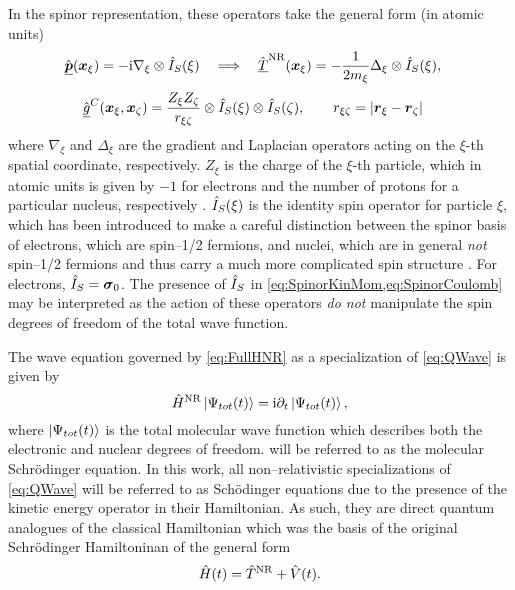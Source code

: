 In the spinor representation, these operators take the general form (in atomic units)
\begin{align}
  \label{eq:SpinorKinMom}
  &\hat{\underline{\boldsymbol{p}}}(\boldsymbol{x}_\xi) = -\mathrm i \nabla_\xi \otimes \hat{I}_S(\xi) \quad \Longrightarrow \quad 
  \hat{\underline{T}}^{\mathrm{NR}}(\boldsymbol{x}_\xi) = - \frac{1}{2m_\xi} \Delta_\xi \otimes \hat{I}_S(\xi),
\end{align}
\begin{align}
  \label{eq:SpinorCoulomb}
  &\hat{\underline{g}}^C(\boldsymbol{x}_\xi,\boldsymbol{x}_\zeta) = 
    \frac{Z_\xi Z_\zeta}{r_{\xi\zeta}} \otimes \hat{I}_S(\xi) \otimes \hat{I}_S(\zeta), \qquad r_{\xi\zeta} = \vert \boldsymbol{r}_\xi - \boldsymbol{r}_\zeta \vert
\end{align}
where $\nabla_\xi$ and $\Delta_\xi$ are the gradient and Laplacian operators acting on the $\xi$-th spatial coordinate,
respectively. $Z_\xi$ is the charge of the $\xi$-th particle, which in atomic units is given by $-1$ for electrons and 
the number of protons for a particular nucleus, respectively . 
$\hat{I}_S(\xi)$  is the identity spin operator for particle $\xi$, which has been introduced to make a
careful distinction between the spinor basis of electrons, which are spin--1/2 fermions, and nuclei, which are in general
\emph{not} spin--1/2 fermions and thus carry a much more complicated spin structure . For electrons, $\hat{I}_S=\boldsymbol{\sigma}_{0}$.
The presence of $\hat{I}_S$ in \cref{eq:SpinorKinMom,eq:SpinorCoulomb} may be interpreted as the action of these operators 
\emph{do not} manipulate the spin degrees of freedom of the total wave function.


The wave equation governed by \cref{eq:FullHNR} as a specialization of \cref{eq:QWave} is given by
\begin{equation}
\label{eq:FullNRSCH}
\hat{H}^{\mathrm{NR}} \left\vert \Psi_{tot} (t) \right\rangle = \mathrm i \partial_t \left\vert \Psi_{tot} (t) \right\rangle,
\end{equation}
where $\left\vert \Psi_{tot} (t) \right\rangle$ is the total molecular wave function which describes both the electronic
and nuclear degrees of freedom.  will be referred to as the molecular Schr\"{o}dinger
equation. In this work, all non--relativistic specializations of \cref{eq:QWave} will be referred to
as Sch\"{o}dinger equations due to the presence of the kinetic energy operator in their Hamiltonian.
As such, they are direct quantum analogues of the classical Hamiltonian which was the basis
of the original Schr\"{o}dinger Hamiltoninan of the general form
\begin{equation}
\label{eq:SchHam}
\hat{H}(t) = \hat{T}^{\mathrm{NR}} + \hat{V}(t).
\end{equation}




